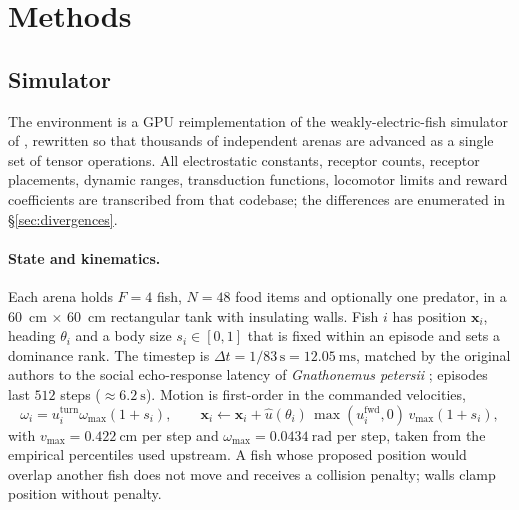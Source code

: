 \section{Methods}
\label{sec:methods}

\subsection{Simulator}

The environment is a GPU reimplementation of the weakly-electric-fish simulator
of \citet{singh2025active}, rewritten so that thousands of independent arenas are
advanced as a single set of tensor operations. All electrostatic constants,
receptor counts, receptor placements, dynamic ranges, transduction functions,
locomotor limits and reward coefficients are transcribed from that codebase; the
differences are enumerated in \S\ref{sec:divergences}.

\paragraph{State and kinematics.}
Each arena holds $F=4$ fish, $N=48$ food items and optionally one predator, in a
\SI{60}{\centi\metre} $\times$ \SI{60}{\centi\metre} rectangular tank with
insulating walls. Fish $i$ has position $\mathbf{x}_i$, heading $\theta_i$ and a
body size $s_i\in[0,1]$ that is fixed within an episode and sets a dominance
rank. The timestep is $\Delta t = 1/83\,\mathrm{s} = \SI{12.05}{\milli\second}$,
matched by the original authors to the social echo-response latency of
\emph{Gnathonemus petersii} \citep{schuster2001count}; episodes last $512$ steps
($\approx\SI{6.2}{\second}$). Motion is first-order in the commanded velocities,
\begin{equation}
\omega_i = u^{\text{turn}}_i \omega_{\max}(1+s_i),\qquad
\mathbf{x}_i \leftarrow \mathbf{x}_i + \hat{u}(\theta_i)\,
  \max(u^{\text{fwd}}_i,0)\, v_{\max}(1+s_i),
\end{equation}
with $v_{\max}=\SI{0.422}{\centi\metre}$ per step and
$\omega_{\max}=\SI{0.0434}{\radian}$ per step, taken from the empirical
percentiles used upstream. A fish whose proposed position would overlap another
fish does not move and receives a collision penalty; walls clamp position without
penalty.

